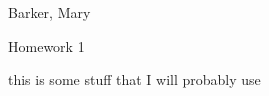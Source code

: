 \documentclass{article}
\def \hwnum{1}
\def \hwdescription{this is some stuff that I will probably use}
\begin{document}
\begin{center}
{
	\fontsize{20pt}{20pt}\selectfont
	Barker, Mary
}


{
	\fontsize{20pt}{20pt}\selectfont
	Homework \hwnum
}


{
	\fontsize{20pt}{20pt}\selectfont
	\hwdescription
}

\end{center}
\pagebreak



\end{document}
